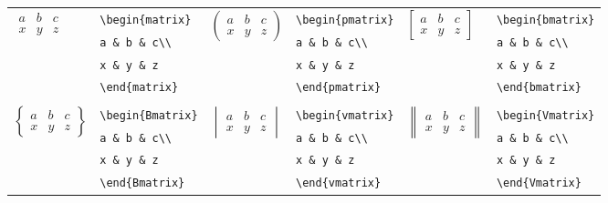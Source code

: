 \documentclass[10pt, english]{article}
\begin{document}
	\begin{center}
		\scriptsize
	\begin{tabular}{ll|ll|ll}
		\multirow{4}{*}{$\begin{matrix}a&b&c\\x&y&z\end{matrix}$} & \verb|\begin{matrix}| & \multirow{4}{*}{$\begin{pmatrix}a&b&c\\x&y&z\end{pmatrix}$} & \verb|\begin{pmatrix}| & \multirow{4}{*}{$\begin{bmatrix}a&b&c\\x&y&z\end{bmatrix}$} & \verb|\begin{bmatrix}|\\ 
		& \verb|a & b & c\\| & & \verb|a & b & c\\| & & \verb|a & b & c\\|\\ 
		& \verb|x & y & z| & & \verb|x & y & z| & & \verb|x & y & z|\\ 
		& \verb|\end{matrix}| & & \verb|\end{pmatrix}| & & \verb|\end{bmatrix}|\\
		\multicolumn{2}{l|}{} & \multicolumn{2}{l|}{} & \multicolumn{2}{l}{}\\
                \multirow{4}{*}{$\begin{Bmatrix}a&b&c\\x&y&z\end{Bmatrix}$} & \verb|\begin{Bmatrix}| & \multirow{4}{*}{$\begin{vmatrix}a&b&c\\x&y&z\end{vmatrix}$} & \verb|\begin{vmatrix}| & \multirow{4}{*}{$\begin{Vmatrix}a&b&c\\x&y&z\end{Vmatrix}$} & \verb|\begin{Vmatrix}|\\
                & \verb|a & b & c\\| & & \verb|a & b & c\\| & & \verb|a & b & c\\|\\
                & \verb|x & y & z| & & \verb|x & y & z| & & \verb|x & y & z|\\
                & \verb|\end{Bmatrix}| & & \verb|\end{vmatrix}| & & \verb|\end{Vmatrix}|\\
	\end{tabular}
	\end{center}
\end{document}
